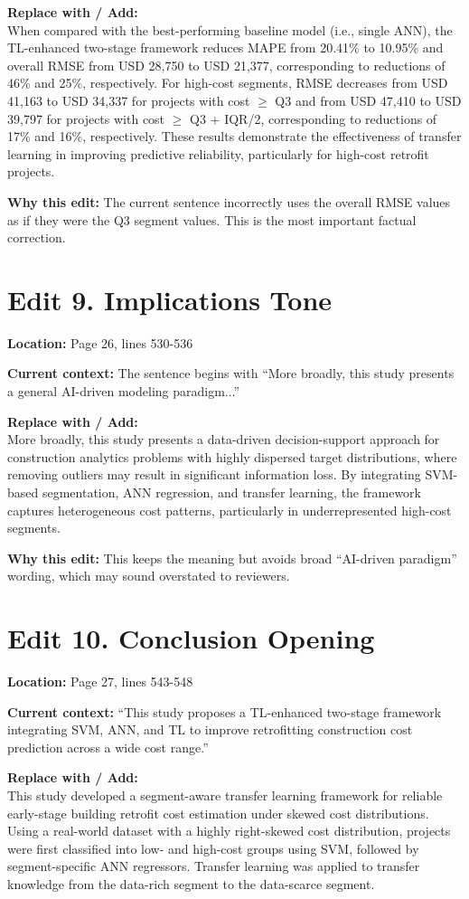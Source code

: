 \documentclass[11pt]{article}
\newcommand{\loc}[1]{\textbf{Location:} #1}
\newcommand{\current}[1]{\textbf{Current context:} #1}
\newcommand{\replacewith}[1]{\textbf{Replace with / Add:}\\{\color{blue}#1}}
\newcommand{\why}[1]{\textbf{Why this edit:} #1}
\begin{document}
\replacewith{When compared with the best-performing baseline model (i.e., single ANN), the TL-enhanced two-stage framework reduces MAPE from 20.41\% to 10.95\% and overall RMSE from USD 28,750 to USD 21,377, corresponding to reductions of 46\% and 25\%, respectively. For high-cost segments, RMSE decreases from USD 41,163 to USD 34,337 for projects with cost $\geq$ Q3 and from USD 47,410 to USD 39,797 for projects with cost $\geq$ Q3 + IQR/2, corresponding to reductions of 17\% and 16\%, respectively. These results demonstrate the effectiveness of transfer learning in improving predictive reliability, particularly for high-cost retrofit projects.}

\why{The current sentence incorrectly uses the overall RMSE values as if they were the Q3 segment values. This is the most important factual correction.}

\section*{Edit 9. Implications Tone}
\loc{Page 26, lines 530-536}

\current{The sentence begins with ``More broadly, this study presents a general AI-driven modeling paradigm...''}

\replacewith{More broadly, this study presents a data-driven decision-support approach for construction analytics problems with highly dispersed target distributions, where removing outliers may result in significant information loss. By integrating SVM-based segmentation, ANN regression, and transfer learning, the framework captures heterogeneous cost patterns, particularly in underrepresented high-cost segments.}

\why{This keeps the meaning but avoids broad ``AI-driven paradigm'' wording, which may sound overstated to reviewers.}

\section*{Edit 10. Conclusion Opening}
\loc{Page 27, lines 543-548}

\current{``This study proposes a TL-enhanced two-stage framework integrating SVM, ANN, and TL to improve retrofitting construction cost prediction across a wide cost range.''}

\replacewith{This study developed a segment-aware transfer learning framework for reliable early-stage building retrofit cost estimation under skewed cost distributions. Using a real-world dataset with a highly right-skewed cost distribution, projects were first classified into low- and high-cost groups using SVM, followed by segment-specific ANN regressors. Transfer learning was applied to transfer knowledge from the data-rich segment to the data-scarce segment.}
\end{document}
